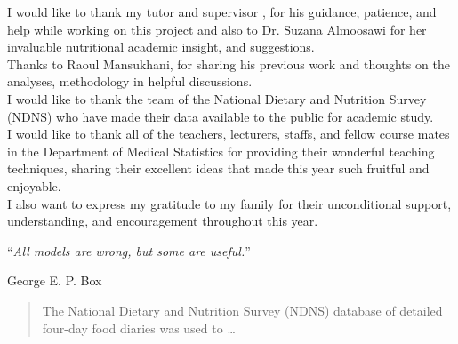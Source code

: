 \documentclass[
12pt, %
english, %
singlespacing, %
headsepline, %
table]{MastersDoctoralThesis} %
\begin{document}
\begin{acknowledgements}
\addchaptertocentry{\acknowledgementname} %

I would like to thank my tutor and supervisor \supname, for his guidance, patience, and help while working on this project and also to Dr. Suzana Almoosawi for her invaluable nutritional academic insight, and suggestions. \\

Thanks to Raoul Mansukhani, for sharing his previous work and thoughts on the analyses, methodology in helpful discussions.	 \\

I would like to thank the team of the National Dietary and Nutrition Survey (NDNS) who have made their data available to the public for academic study. \\

I would like to thank all of the teachers, lecturers, staffs, and fellow course mates in the Department of Medical Statistics for providing their wonderful teaching techniques, sharing their excellent ideas that made this year such fruitful and enjoyable.\\


I also want to express my gratitude to my family for their unconditional support, understanding, and encouragement throughout this year. \\

\end{acknowledgements}


\cleardoublepage


\vspace*{0.2\textheight}

\noindent\enquote{\itshape All models are wrong, but some are useful.}\bigbreak

\hfill George E. P. Box


\begin{abstract}
\addchaptertocentry{\abstractname} %
The National Dietary and Nutrition Survey (NDNS) database of detailed four-day food diaries was used to \dots
\end{abstract}
\end{document}
